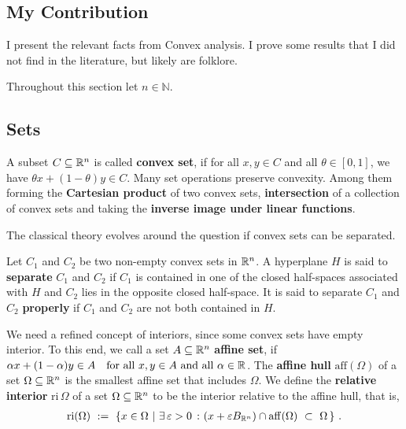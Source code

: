 \subsection*{My Contribution}
I present the relevant facts from Convex analysis.
I prove some results that I did not find in the literature, but likely are folklore.

Throughout this section let $n\in\mathbb{N}$.
\subsection*{Sets}
A subset $C\subseteq \mathbb{R}^n$ is called \textbf{convex set}, 
if for all $x,y\in C$ and all $\theta\in [0,1]$,
we have 
$
  \theta x + (1-\theta)y 
  \in
  C
$.
Many set operations preserve convexity. Among them
forming the 
\textbf{Cartesian product} of two convex sets, 
\textbf{intersection} of a collection of convex sets and 
taking the \textbf{inverse image under linear functions}.

The classical theory evolves around the question 
if convex sets can be separated.
\begin{definition*}
  Let 
  $C_1$ and $C_2$
  be two non-empty convex sets in $\mathbb{R}^n$. 
  A hyperplane $H$ is said to \textbf{separate}
  $C_1$ and $C_2$
  if $C_1$ is contained in one of the closed half-spaces associated with
  $H$ and $C_2$ lies in the opposite closed half-space. It is said to separate 
  $C_1$ and $C_2$
  \textbf{properly} if 
  $C_1$ and $C_2$
  are not both contained in $H$.
\end{definition*}

We need a refined concept of interiors, since some convex sets have empty interior. To this end, 
  we call a set
  $A\subseteq \mathbb{R}^n$ 
  \textbf{affine set}, if
  $
    \alpha x + (1-\alpha)y \in A
    \quad
    \text{for all}
    \ 
    x,y \in A
    \ 
    \text{and all}
    \ 
    \alpha \in \R
  $.
  The \textbf{affine hull} 
  $\mathrm{aff}(\Omega)$
  of a set 
  $\Omega\subseteq \mathbb{R}^n$
  is the smallest affine set that includes $\Omega$.
  We define the \textbf{relative interior}
  $\mathrm{ri}\,\Omega$ 
  of a set 
  $\Omega\subseteq \mathbb{R}^n$
  to be the interior relative to the affine hull, that is,
    \begin{gather}
    \mathrm{ri}(\Omega)
    \ 
    :=
    \ 
    \left\{ 
      x \in \Omega 
      \ 
      |
      \ 
      \exists
      \,
      \varepsilon > 0\ 
      \colon
      (
      x+\varepsilon B_{\R^n}
      )
      \cap
      \mathrm{aff}(\Omega)
      \ 
      \subset
      \ 
      \Omega
      \,
    \right\}
    \,.
  \end{gather}

